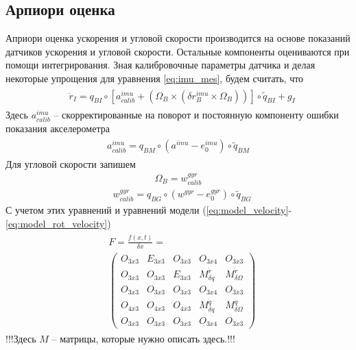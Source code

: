 \documentclass[a4paper,12pt]{article}
\begin{document}
\subsection{Арпиори оценка}
Априори оценка ускорения и угловой скорости производится на основе показаний датчиков ускорения и угловой скорости. Остальные компоненты оцениваются при помощи интегрирования.
Зная калибровочные параметры датчика и делая некоторые упрощения для уравнения \eqref{eq:imu_mes}, будем считать, что
\begin{align} 
\begin{split}
&\ddot{r}_{I} = {q}_{BI} \circ  [a^{imu}_{calib} + (\Omega_B \times (\delta r^{imu}_B \times \Omega_B))] \circ \tilde{q}_{BI} + g_I
\end{split}
\end{align}
Здесь $a^{imu}_{calib}$ -- скорректированные на поворот и постоянную компоненту ошибки показания акселерометра
\begin{align} 
\begin{split}
a^{imu}_{calib} = q_{BM} \circ (a^{imu} - e^{imu}_0) \circ \tilde{q}_{BM}
\end{split}
\end{align}
Для угловой скорости запишем
\begin{align} 
\Omega_B = w^{\textit{gyr}}_{calib}
\end{align}
\begin{align} 
&w^{\textit{gyr}}_{calib} = q_{BG} \circ (w^{\textit{gyr}} - e_0^{\textit{gyr}}) \circ \tilde{q}_{BG}
\end{align}
С учетом этих уравнений и уравнений модели  (\ref{eq:model_velocity}-\ref{eq:model_rot_velocity})
\begin{align}
\begin{split}
&F = \frac{f(x,t)}{\delta x} = \\
&\begin{pmatrix}
O_{3x3} & E_{3x3} & O_{3x3} & O_{3x4} & O_{3x3}\\
O_{3x3} & O_{3x3} & E_{3x3} & M^{\ddot{r}}_{\delta q} &M^{\ddot{r}}_{\delta \Omega}\\
O_{3x3} & O_{3x3} & O_{3x3} & O_{3x4} & O_{3x3}\\
O_{4x3} & O_{4x3} & O_{4x3} & M^{\dot{q}}_{\delta q} & M^{\dot{q}}_{\delta \Omega}\\
O_{3x3} & O_{3x3} & O_{3x3} & O_{3x4} & O_{3x3}
\end{pmatrix}
\end{split}
\end{align}
!!!Здесь $M$ -- матрицы, которые нужно описать здесь.!!!
\end{document}
